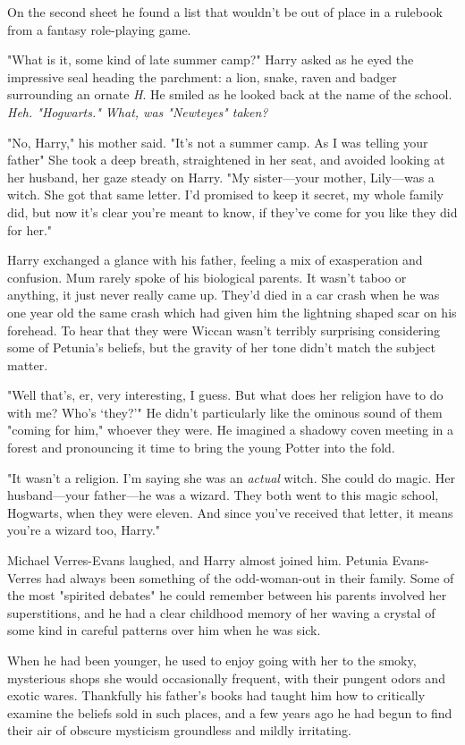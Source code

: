 On the second sheet he found a list that wouldn't be out
of place in a rulebook from a fantasy role-playing game.

"What is it, some kind of late summer camp?" Harry
asked as he eyed the impressive seal heading the
parchment: a lion, snake, raven and badger surrounding
an ornate \emph{H}. He smiled as he looked back at the name of
the school. \emph{Heh. "Hogwarts." What, was "Newteyes" taken?}

"No, Harry," his mother said. "It's not a summer camp. As
I was telling your father{\el}" She took a deep breath,
straightened in her seat, and avoided looking at her
husband, her gaze steady on Harry. "My sister—your mother,
Lily—was a witch. She got that same letter. I'd promised
to keep it secret, my whole family did, but now it's clear
you're meant to know, if they've come for you like they
did for her."

Harry exchanged a glance with his father, feeling a mix of
exasperation and confusion. Mum rarely spoke of his
biological parents. It wasn't taboo or anything, it just never
really came up. They'd died in a car crash when he was
one year old{\el} the same crash which had given him the
lightning shaped scar on his forehead. To hear that they
were Wiccan wasn't terribly surprising considering some of
Petunia's beliefs, but the gravity of her tone didn't match
the subject matter.

"Well that's, er, very interesting, I guess. But what does
her religion have to do with me? Who's `they?'" He didn't
particularly like the ominous sound of them "coming for
him," whoever they were. He imagined a shadowy coven
meeting in a forest and pronouncing it time to bring the
young Potter into the fold.

"It wasn't a religion. I'm saying she was an \emph{actual} witch.
She could do magic. Her husband—your father—he was a
wizard. They both went to this magic school, Hogwarts,
when they were eleven. And since you've received that letter, it
means you're a wizard too, Harry."

Michael Verres-Evans laughed, and Harry almost joined
him. Petunia Evans-Verres had always been something of
the odd-woman-out in their family. Some of the most
"spirited debates" he could remember between his parents
involved her superstitions, and he had a clear childhood
memory of her waving a crystal of some kind in careful
patterns over him when he was sick.

When he had been younger, he used to enjoy going with her to
the smoky, mysterious shops she would occasionally
frequent, with their pungent odors and exotic wares.
Thankfully his father's books had taught him how to
critically examine the beliefs sold in such places, and a few
years ago he had begun to find their air of obscure
mysticism groundless and mildly irritating.

